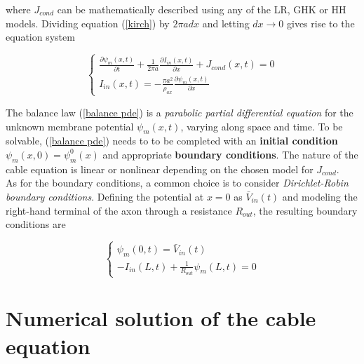 \documentclass[12pt, a4paper]{report}
\begin{document}
where $J_{cond}$ can be mathematically described using any of the LR, GHK or HH models. Dividing equation (\ref{kirch})  by $2 \pi a dx $ and letting $dx \rightarrow 0$ gives rise to the equation system

\begin{equation}
\begin{cases}
 \frac{ \displaystyle \partial \psi_m(x,t)}{\displaystyle \partial t} + \displaystyle \frac{\displaystyle 1}{ \displaystyle2 \pi a }\frac{\displaystyle \partial I_{in}(x,t)}{\displaystyle \partial x} + J_{cond}(x,t) = 0 \\[1em]
I_{in}(x,t) =   -\frac{\displaystyle \pi a^2}{\displaystyle \rho_{ax}}\frac{\displaystyle \partial \psi_m(x,t)}{\displaystyle \partial x}
\end{cases} \label{balance pde}
\end{equation}

The balance law (\ref{balance pde}) is a \textit{parabolic partial differential equation} for the unknown membrane potential $\psi_m(x,t) $, varying along space and time. To be solvable, (\ref*{balance pde}) needs to to be completed with an \textbf{initial condition} $ \psi_m (x,0) = \psi_m^0(x)$ and appropriate \textbf{boundary conditions}. The nature of the cable equation is linear or nonlinear depending on the chosen model for $J_{cond}$.\\
As for the boundary conditions, a common choice is to consider \textit{Dirichlet-Robin boundary conditions}. Defining the potential at $x=0$ as $\bar{V}_{in}(t)$ and modeling the right-hand terminal of the axon through a resistance $R_{out}$, the resulting boundary conditions are

\begin{equation}
\begin{cases}
\psi_m(0,t) = \bar{V}_{in}(t) \\
-I_{in}(L,t) +\displaystyle \frac{1}{R_{out}}\psi_m(L,t) =0
\end{cases}
\end{equation}



\section{Numerical solution of the cable equation}
\end{document}
